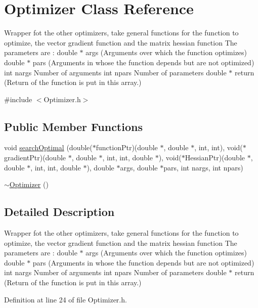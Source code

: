 \hypertarget{classOptimizer}{}\section{Optimizer Class Reference}
\label{classOptimizer}


Wrapper fot the other optimizers, take general functions for the function to optimize, the vector gradient function and the matrix hessian function The parameters are \+: double $\ast$ args (Arguments over which the function optimizes) double $\ast$ pars (Arguments in whose the function depends but are not optimized) int nargs Number of arguments int npars Number of parameters double $\ast$ return (Return of the function is put in this array.)  




{\ttfamily \#include $<$Optimizer.\+h$>$}

\subsection*{Public Member Functions}
\begin{DoxyCompactItemize}
\item 
void \hyperlink{classOptimizer_ab3c54cfddcd5e97c1dae4cc6bd4e4e92}{search\+Optimal} (double($\ast$function\+Ptr)(double $\ast$, double $\ast$, int, int), void($\ast$gradient\+Ptr)(double $\ast$, double $\ast$, int, int, double $\ast$), void($\ast$Hessian\+Ptr)(double $\ast$, double $\ast$, int, int, double $\ast$), double $\ast$args, double $\ast$pars, int nargs, int npars)
\item 
\hyperlink{classOptimizer_ab01202385afea2f09afbd73227736a17}{$\sim$\+Optimizer} ()
\end{DoxyCompactItemize}


\subsection{Detailed Description}
Wrapper fot the other optimizers, take general functions for the function to optimize, the vector gradient function and the matrix hessian function The parameters are \+: double $\ast$ args (Arguments over which the function optimizes) double $\ast$ pars (Arguments in whose the function depends but are not optimized) int nargs Number of arguments int npars Number of parameters double $\ast$ return (Return of the function is put in this array.) 

Definition at line 24 of file Optimizer.\+h.



